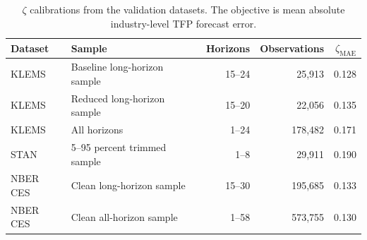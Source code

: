 \begin{table}[t]
\centering
\caption{$\zeta$ calibrations from the validation datasets. The objective is mean absolute industry-level TFP forecast error.} 
\label{tab:zeta_calibration_code}
\begin{tabular}{llrrr}
  \hline
Dataset & Sample & Horizons & Observations & $\zeta_{\mathrm{MAE}}$ \\ 
  \hline
KLEMS & Baseline long-horizon sample & 15--24 & 25,913 & 0.128 \\ 
  KLEMS & Reduced long-horizon sample & 15--20 & 22,056 & 0.135 \\ 
  KLEMS & All horizons & 1--24 & 178,482 & 0.171 \\ 
  STAN & 5--95 percent trimmed sample & 1--8 & 29,911 & 0.190 \\ 
  NBER CES & Clean long-horizon sample & 15--30 & 195,685 & 0.133 \\ 
  NBER CES & Clean all-horizon sample & 1--58 & 573,755 & 0.130 \\ 
   \hline
\end{tabular}
\end{table}
